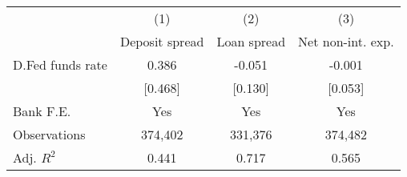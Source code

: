{
\def\sym#1{\ifmmode^{#1}\else\(^{#1}\)\fi}
\begin{tabular*}{\hsize}{@{\hskip\tabcolsep\extracolsep\fill}l*{3}{c}}
\hline\hline
                    &\multicolumn{1}{c}{(1)}&\multicolumn{1}{c}{(2)}&\multicolumn{1}{c}{(3)}\\
                    &\multicolumn{1}{c}{Deposit spread}&\multicolumn{1}{c}{Loan spread}&\multicolumn{1}{c}{Net non-int. exp.}\\
\hline
D.Fed funds rate    &       0.386         &      -0.051         &      -0.001         \\
                    &     [0.468]         &     [0.130]         &     [0.053]         \\
\hline
Bank F.E.           &         Yes         &         Yes         &         Yes         \\
Observations        &     374,402         &     331,376         &     374,482         \\
Adj. \(R^{2}\)      &       0.441         &       0.717         &       0.565         \\
\hline\hline
\end{tabular*}
}
